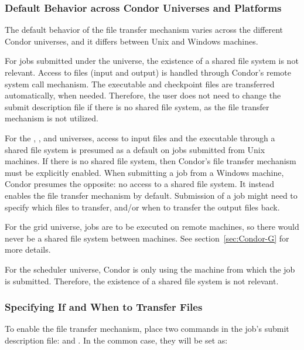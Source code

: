 \subsubsection{Default Behavior across Condor Universes and Platforms}

The default behavior of the file transfer mechanism
varies across the different Condor universes,
and it differs between Unix and Windows machines.

For jobs submitted under the  universe,
the existence of a shared file system is not relevant.
Access to files (input and output) is handled through Condor's
remote system call mechanism.
The executable and checkpoint files are transferred automatically, when
needed. 
Therefore, the user does not need to change the submit description
file if there is no shared file system,
as the file transfer mechanism is not utilized.

For the , , and 
universes, access to input files and the executable
through a shared file system is presumed as a default 
on jobs submitted from Unix machines.
If there is no shared file system, then Condor's file transfer
mechanism must be explicitly enabled.
When submitting a job from a Windows machine,
Condor presumes the opposite: no access to a shared file system.
It instead enables the file transfer mechanism by default.
Submission of a job might need to specify which files to
transfer, and/or when to transfer the output files back.

For the grid universe,
jobs are to be executed on remote machines, so there would never
be a shared file system between machines.
See section~\ref{sec:Condor-G} for more details.

For the scheduler universe,
Condor is only using the machine from which the job is submitted.
Therefore, the existence of a shared file system is not relevant.


\subsubsection{Specifying If and When to Transfer Files
\label{sec:file-transfer-if-when}}

To enable the file transfer mechanism, place two commands
in the job's submit description file:
 and .
In the common case, they will be set as:

